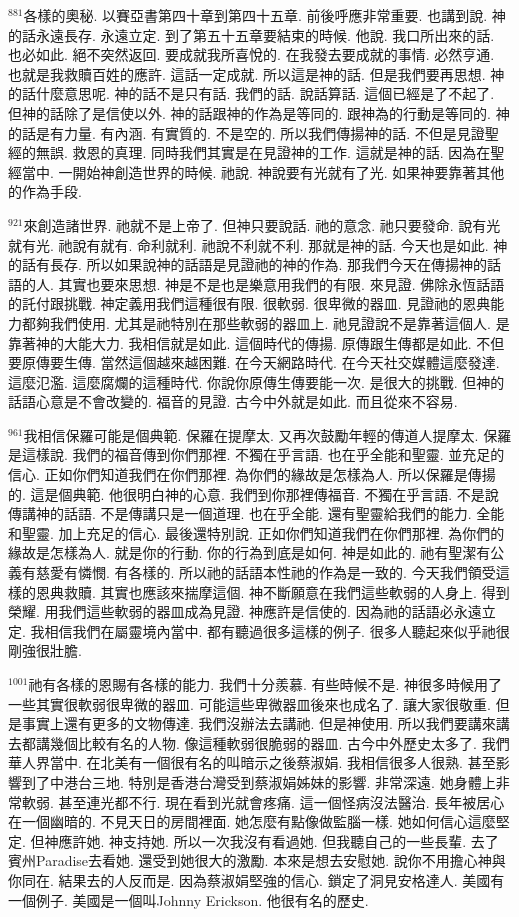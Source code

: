\documentclass{book}
\begin{document}
$^{881}$各樣的奧秘.
以賽亞書第四十章到第四十五章.
前後呼應非常重要.
也講到說.
神的話永遠長存.
永遠立定.
到了第五十五章要結束的時候.
他說.
我口所出來的話.
也必如此.
絕不突然返回.
要成就我所喜悅的.
在我發去要成就的事情.
必然亨通.
也就是我救贖百姓的應許.
這話一定成就.
所以這是神的話.
但是我們要再思想.
神的話什麼意思呢.
神的話不是只有話.
我們的話.
說話算話.
這個已經是了不起了.
但神的話除了是信使以外.
神的話跟神的作為是等同的.
跟神為的行動是等同的.
神的話是有力量.
有內涵.
有實質的.
不是空的.
所以我們傳揚神的話.
不但是見證聖經的無誤.
救恩的真理.
同時我們其實是在見證神的工作.
這就是神的話.
因為在聖經當中.
一開始神創造世界的時候.
祂說.
神說要有光就有了光.
如果神要靠著其他的作為手段.

$^{921}$來創造諸世界.
祂就不是上帝了.
但神只要說話.
祂的意念.
祂只要發命.
說有光就有光.
祂說有就有.
命利就利.
祂說不利就不利.
那就是神的話.
今天也是如此.
神的話有長存.
所以如果說神的話語是見證祂的神的作為.
那我們今天在傳揚神的話語的人.
其實也要來思想.
神是不是也是樂意用我們的有限.
來見證.
佛除永恆話語的託付跟挑戰.
神定義用我們這種很有限.
很軟弱.
很卑微的器皿.
見證祂的恩典能力都夠我們使用.
尤其是祂特別在那些軟弱的器皿上.
祂見證說不是靠著這個人.
是靠著神的大能大力.
我相信就是如此.
這個時代的傳揚.
原傳跟生傳都是如此.
不但要原傳要生傳.
當然這個越來越困難.
在今天網路時代.
在今天社交媒體這麼發達.
這麼氾濫.
這麼腐爛的這種時代.
你說你原傳生傳要能一次.
是很大的挑戰.
但神的話語心意是不會改變的.
福音的見證.
古今中外就是如此.
而且從來不容易.

$^{961}$我相信保羅可能是個典範.
保羅在提摩太.
又再次鼓勵年輕的傳道人提摩太.
保羅是這樣說.
我們的福音傳到你們那裡.
不獨在乎言語.
也在乎全能和聖靈.
並充足的信心.
正如你們知道我們在你們那裡.
為你們的緣故是怎樣為人.
所以保羅是傳揚的.
這是個典範.
他很明白神的心意.
我們到你那裡傳福音.
不獨在乎言語.
不是說傳講神的話語.
不是傳講只是一個道理.
也在乎全能.
還有聖靈給我們的能力.
全能和聖靈.
加上充足的信心.
最後還特別說.
正如你們知道我們在你們那裡.
為你們的緣故是怎樣為人.
就是你的行動.
你的行為到底是如何.
神是如此的.
祂有聖潔有公義有慈愛有憐憫.
有各樣的.
所以祂的話語本性祂的作為是一致的.
今天我們領受這樣的恩典救贖.
其實也應該來揣摩這個.
神不斷願意在我們這些軟弱的人身上.
得到榮耀.
用我們這些軟弱的器皿成為見證.
神應許是信使的.
因為祂的話語必永遠立定.
我相信我們在屬靈境內當中.
都有聽過很多這樣的例子.
很多人聽起來似乎祂很剛強很壯膽.

$^{1001}$祂有各樣的恩賜有各樣的能力.
我們十分羨慕.
有些時候不是.
神很多時候用了一些其實很軟弱很卑微的器皿.
可能這些卑微器皿後來也成名了.
讓大家很敬重.
但是事實上還有更多的文物傳達.
我們沒辦法去講祂.
但是神使用.
所以我們要講來講去都講幾個比較有名的人物.
像這種軟弱很脆弱的器皿.
古今中外歷史太多了.
我們華人界當中.
在北美有一個很有名的叫暗示之後蔡淑娟.
我相信很多人很熟.
甚至影響到了中港台三地.
特別是香港台灣受到蔡淑娟姊妹的影響.
非常深遠.
她身體上非常軟弱.
甚至連光都不行.
現在看到光就會疼痛.
這一個怪病沒法醫治.
長年被居心在一個幽暗的.
不見天日的房間裡面.
她怎麼有點像做監腦一樣.
她如何信心這麼堅定.
但神應許她.
神支持她.
所以一次我沒有看過她.
但我聽自己的一些長輩.
去了賓州Paradise去看她.
還受到她很大的激勵.
本來是想去安慰她.
說你不用擔心神與你同在.
結果去的人反而是.
因為蔡淑娟堅強的信心.
鎖定了洞見安格達人.
美國有一個例子.
美國是一個叫Johnny Erickson.
他很有名的歷史.
\end{document}
